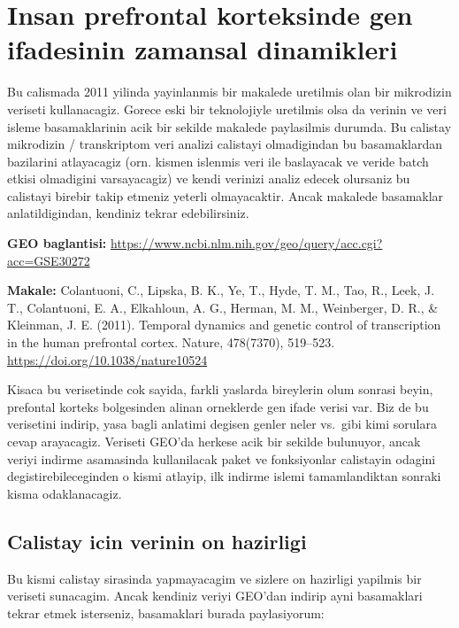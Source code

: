 \documentclass[
]{book}
\begin{document}
\hypertarget{insan-prefrontal-korteksinde-gen-ifadesinin-zamansal-dinamikleri}{%
\chapter{Insan prefrontal korteksinde gen ifadesinin zamansal dinamikleri}\label{insan-prefrontal-korteksinde-gen-ifadesinin-zamansal-dinamikleri}}

Bu calismada 2011 yilinda yayinlanmis bir makalede uretilmis olan bir mikrodizin veriseti kullanacagiz. Gorece eski bir teknolojiyle uretilmis olsa da verinin ve veri isleme basamaklarinin acik bir sekilde makalede paylasilmis durumda. Bu calistay mikrodizin / transkriptom veri analizi calistayi olmadigindan bu basamaklardan bazilarini atlayacagiz (orn. kismen islenmis veri ile baslayacak ve veride batch etkisi olmadigini varsayacagiz) ve kendi verinizi analiz edecek olursaniz bu calistayi birebir takip etmeniz yeterli olmayacaktir. Ancak makalede basamaklar anlatildigindan, kendiniz tekrar edebilirsiniz.

\textbf{GEO baglantisi:} \url{https://www.ncbi.nlm.nih.gov/geo/query/acc.cgi?acc=GSE30272}

\textbf{Makale:} Colantuoni, C., Lipska, B. K., Ye, T., Hyde, T. M., Tao, R., Leek, J. T., Colantuoni, E. A., Elkahloun, A. G., Herman, M. M., Weinberger, D. R., \& Kleinman, J. E. (2011). Temporal dynamics and genetic control of transcription in the human prefrontal cortex. Nature, 478(7370), 519--523. \url{https://doi.org/10.1038/nature10524}

Kisaca bu verisetinde cok sayida, farkli yaslarda bireylerin olum sonrasi beyin, prefontal korteks bolgesinden alinan orneklerde gen ifade verisi var. Biz de bu verisetini indirip, yasa bagli anlatimi degisen genler neler vs.~gibi kimi sorulara cevap arayacagiz. Veriseti GEO'da herkese acik bir sekilde bulunuyor, ancak veriyi indirme asamasinda kullanilacak paket ve fonksiyonlar calistayin odagini degistirebileceginden o kismi atlayip, ilk indirme islemi tamamlandiktan sonraki kisma odaklanacagiz.

\hypertarget{calistay-icin-verinin-on-hazirligi}{%
\section{Calistay icin verinin on hazirligi}\label{calistay-icin-verinin-on-hazirligi}}

Bu kismi calistay sirasinda yapmayacagim ve sizlere on hazirligi yapilmis bir veriseti sunacagim. Ancak kendiniz veriyi GEO'dan indirip ayni basamaklari tekrar etmek isterseniz, basamaklari burada paylasiyorum:
\end{document}
